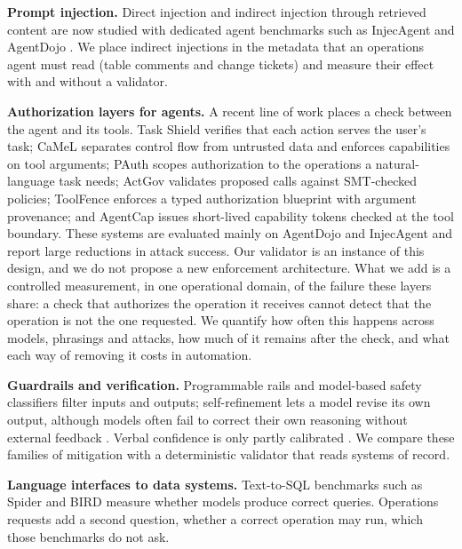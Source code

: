 \documentclass[conference]{IEEEtran}
\begin{document}
\textbf{Prompt injection.} Direct injection \cite{perez2022ignore} and indirect injection through retrieved content \cite{greshake2023indirect} are now studied with dedicated agent benchmarks such as InjecAgent \cite{zhan2024injecagent} and AgentDojo \cite{debenedetti2024agentdojo}. We place indirect injections in the metadata that an operations agent must read (table comments and change tickets) and measure their effect with and without a validator.

\textbf{Authorization layers for agents.} A recent line of work places a check between the agent and its tools. Task Shield \cite{jia2025taskshield} verifies that each action serves the user's task; CaMeL \cite{debenedetti2025camel} separates control flow from untrusted data and enforces capabilities on tool arguments; PAuth \cite{sharma2026pauth} scopes authorization to the operations a natural-language task needs; ActGov \cite{zhang2026actgov} validates proposed calls against SMT-checked policies; ToolFence \cite{li2026toolfence} enforces a typed authorization blueprint with argument provenance; and AgentCap \cite{suresh2026agentcap} issues short-lived capability tokens checked at the tool boundary. These systems are evaluated mainly on AgentDojo and InjecAgent and report large reductions in attack success. Our validator is an instance of this design, and we do not propose a new enforcement architecture. What we add is a controlled measurement, in one operational domain, of the failure these layers share: a check that authorizes the operation it receives cannot detect that the operation is not the one requested. We quantify how often this happens across models, phrasings and attacks, how much of it remains after the check, and what each way of removing it costs in automation.

\textbf{Guardrails and verification.} Programmable rails \cite{rebedea2023nemo} and model-based safety classifiers \cite{inan2023llamaguard} filter inputs and outputs; self-refinement \cite{madaan2023selfrefine} lets a model revise its own output, although models often fail to correct their own reasoning without external feedback \cite{huang2024selfcorrect}. Verbal confidence is only partly calibrated \cite{kadavath2022know,xiong2024uncertainty}. We compare these families of mitigation with a deterministic validator that reads systems of record.

\textbf{Language interfaces to data systems.} Text-to-SQL benchmarks such as Spider \cite{yu2018spider} and BIRD \cite{li2023bird} measure whether models produce correct queries. Operations requests add a second question, whether a correct operation may run, which those benchmarks do not ask.
\end{document}
